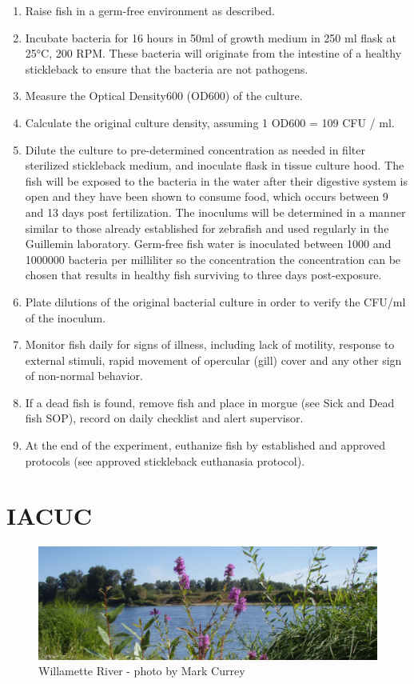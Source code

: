 \documentclass[
]{book}
\providecommand{\tightlist}{%
  \setlength{\itemsep}{0pt}\setlength{\parskip}{0pt}}
\begin{document}
\begin{enumerate}
\def\labelenumi{\arabic{enumi}.}
\tightlist
\item
  Raise fish in a germ-free environment as described.
\item
  Incubate bacteria for 16 hours in 50ml of growth medium in 250 ml flask at 25°C, 200 RPM. These bacteria will originate from the intestine of a healthy stickleback to ensure that the bacteria are not pathogens.
\item
  Measure the Optical Density600 (OD600) of the culture.\\
\item
  Calculate the original culture density, assuming 1 OD600 = 109 CFU / ml.
\item
  Dilute the culture to pre-determined concentration as needed in filter sterilized stickleback medium, and inoculate flask in tissue culture hood. The fish will be exposed to the bacteria in the water after their digestive system is open and they have been shown to consume food, which occurs between 9 and 13 days post fertilization. The inoculums will be determined in a manner similar to those already established for zebrafish and used regularly in the Guillemin laboratory. Germ-free fish water is inoculated between 1000 and 1000000 bacteria per milliliter so the concentration the concentration can be chosen that results in healthy fish surviving to three days post-exposure.
\item
  Plate dilutions of the original bacterial culture in order to verify the CFU/ml of the inoculum.
\item
  Monitor fish daily for signs of illness, including lack of motility, response to external stimuli, rapid movement of opercular (gill) cover and any other sign of non-normal behavior.
\item
  If a dead fish is found, remove fish and place in morgue (see Sick and Dead fish SOP), record on daily checklist and alert supervisor.
\item
  At the end of the experiment, euthanize fish by established and approved protocols (see approved stickleback euthanasia protocol).
\end{enumerate}

\hypertarget{iacuc}{%
\chapter{IACUC}\label{iacuc}}

\begin{figure}
\centering
\includegraphics{images/willamette_header.jpg}
\caption{Willamette River - photo by Mark Currey}
\end{figure}
\end{document}
